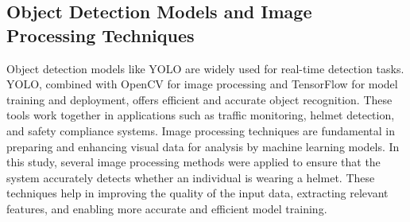 \begin{refsection}
\subsection{Object Detection Models and Image Processing Techniques}


    Object detection models like YOLO are widely used for real-time detection tasks. YOLO, combined with OpenCV for image processing and TensorFlow for model training and deployment, offers efficient and accurate object recognition. These tools work together in applications such as traffic monitoring, helmet detection, and safety compliance systems.  Image processing techniques are fundamental in preparing and enhancing visual data for analysis by machine learning models. In this study, several image processing methods were applied to ensure that the system accurately detects whether an individual is wearing a helmet. These techniques help in improving the quality of the input data, extracting relevant features, and enabling more accurate and efficient model training.



\end{refsection}
